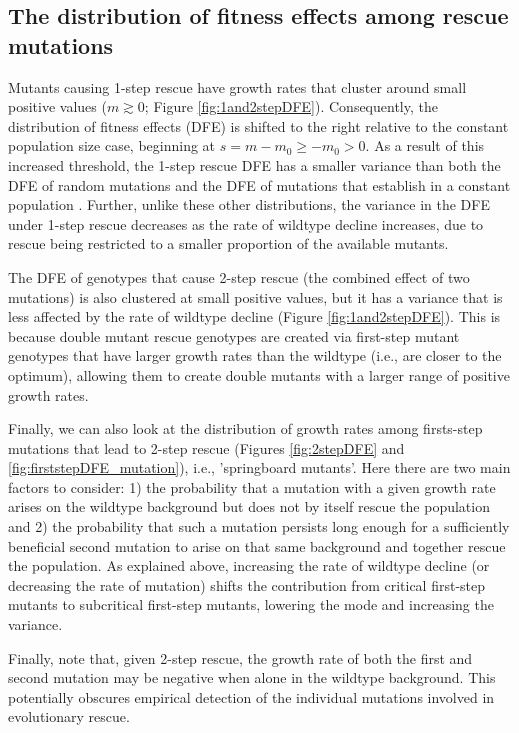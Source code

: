\documentclass[9pt,twocolumn,twoside,lineno]{gsajnl}
\begin{document}
\subsection{The distribution of fitness effects among rescue mutations}

Mutants causing 1-step rescue have growth rates that cluster around small positive values ($m\gtrsim 0$; Figure \ref{fig:1and2stepDFE}).
Consequently, the distribution of fitness effects (DFE) is shifted to the right relative to the constant population size case, beginning at $s= m - m_0 \geq -m_0 > 0$.
As a result of this increased threshold, the 1-step rescue DFE has a smaller variance than both the DFE of random mutations and the DFE of mutations that establish in a constant population \citep{Kimura1983}. 
Further, unlike these other distributions, the variance in the DFE under 1-step rescue decreases as the rate of wildtype decline increases, due to rescue being restricted to a smaller proportion of the available mutants.

The DFE of genotypes that cause 2-step rescue (the combined effect of two mutations) is also clustered at small positive values, but it has a variance that is less affected by the rate of wildtype decline (Figure \ref{fig:1and2stepDFE}).
This is because double mutant rescue genotypes are created via first-step mutant genotypes that have larger growth rates than the wildtype (i.e., are closer to the optimum), allowing them to create double mutants with a larger range of positive growth rates.

Finally, we can also look at the distribution of growth rates among firsts-step mutations that lead to 2-step rescue (Figures \ref{fig:2stepDFE} and \ref{fig:firststepDFE_mutation}), i.e., 'springboard mutants'.
Here there are two main factors to consider: 1) the probability that a mutation with a given growth rate arises on the wildtype background but does not by itself rescue the population and 2) the probability that such a mutation persists long enough for a sufficiently beneficial second mutation to arise on that same background and together rescue the population. 
As explained above, increasing the rate of wildtype decline (or decreasing the rate of mutation) shifts the contribution from critical first-step mutants to subcritical first-step mutants, lowering the mode and increasing the variance.

Finally, note that, given 2-step rescue, the growth rate of both the first and second mutation may be negative when alone in the wildtype background. 
This potentially obscures empirical detection of the individual mutations involved in evolutionary rescue. 
\end{document}
